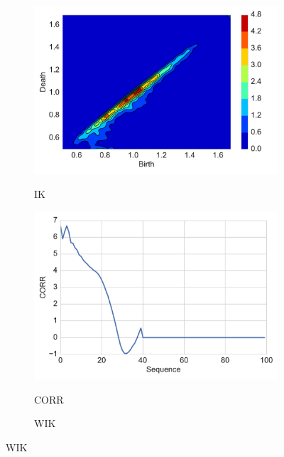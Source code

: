 \documentclass[12pt]{article}
\begin{document}
\begin{figure}[htbp]
\begin{subfigure}{.24\textwidth}
    \label{fig:examplestest4}
  \end{subfigure}
    \begin{subfigure}{.24\textwidth}
    \centering
        \caption{IK}  
        \includegraphics[width=\linewidth]{figure_5_kernel.pdf}
    \label{fig:examplestest5}
  \end{subfigure}
    \begin{subfigure}{.24\textwidth}
    \centering
        \caption{CORR}  \includegraphics[width=\linewidth]{figure_5_corr_fun.pdf}
    \label{fig:examplestest6}
  \end{subfigure}
    \begin{subfigure}{.24\textwidth}
    \centering
        \caption{WIK}   

\end{subfigure}
\end{figure}
\end{document}
